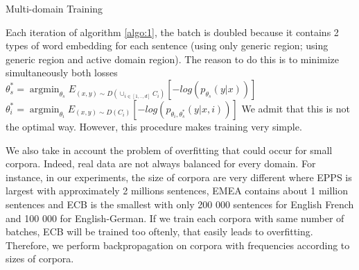 \documentclass[11pt,a4paper]{article}
\DeclareMathOperator*{\argmin}{argmin}
\newcommand{\fyTodo}[1]{\Todo[FY:]{\textcolor{orange}{#1}}}
\begin{document}
\begin{algorithm}[H]
\caption{Multi-domain Training}
\label{algo:1}
\begin{algorithmic}[1]
\REPEAT 
{}
\end{algorithmic}
\end{algorithm}

Each iteration of algorithm \ref{algo:1}, the batch is doubled because it contains 2 types of word embedding for each sentence (using only generic region; using generic region and active domain region). The reason to do this is to minimize simultaneously both losses \\
$\theta^*_{s}=\displaystyle{\mathop{\argmin}_{\theta_s}}E_{(x,y) \sim D(\displaystyle{\mathop{\cup}_{i \in [1,..,d]}}C_{i})}[-log(p_{\theta_s}(y|x))]$ \\ 
$ \theta^*_{i}=\displaystyle{\mathop{\argmin}_{\theta_i}}E_{(x,y) \sim D(C_{i})}[-log(p_{\theta_i,\theta^*_s}(y|x,i))]
$ 
We admit that this is not the optimal way. However, this procedure makes training very simple.\fyTodo{Explain technicalities - future work ?}

We also take in account the problem of overfitting that could occur for small corpora. Indeed, real data are not always balanced for every domain. For instance, in our experiments, the size of corpora are very different where EPPS is largest with approximately 2 millions sentences, EMEA contains about 1 million sentences and ECB is the smallest with only 200 000 sentences for English French and 100 000 for English-German. If we train each corpora with same number of batches, ECB will be trained too oftenly, that easily leads to overfitting. Therefore, we perform backpropagation on corpora with frequencies according to sizes of corpora. \fyTodo{Refs on this ? or contrast ?}
\end{document}
